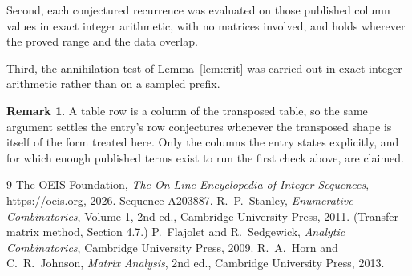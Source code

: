 \documentclass[11pt,a4paper]{article}
\theoremstyle{plain}
\theoremstyle{definition}
\newtheorem{remark}[theorem]{Remark}
\begin{document}
Second, each conjectured recurrence was evaluated on those published column values in exact
integer arithmetic, with no matrices involved, and holds wherever the proved range and the
data overlap.

Third, the annihilation test of Lemma~\ref{lem:crit} was carried out in exact integer
arithmetic rather than on a sampled prefix.

\begin{remark}
A table row is a column of the transposed table, so the same argument settles the entry's row
conjectures whenever the transposed shape is itself of the form treated here. Only the columns
the entry states explicitly, and for which enough published terms exist to run the first check
above, are claimed.
\end{remark}

\begin{thebibliography}{9}
 The OEIS Foundation, \emph{The On-Line Encyclopedia of Integer
Sequences}, \url{https://oeis.org}, 2026. Sequence A203887.
 R.~P.~Stanley, \emph{Enumerative Combinatorics}, Volume 1, 2nd ed.,
Cambridge University Press, 2011. (Transfer-matrix method, Section 4.7.)
 P.~Flajolet and R.~Sedgewick, \emph{Analytic Combinatorics}, Cambridge
University Press, 2009.
 R.~A.~Horn and C.~R.~Johnson, \emph{Matrix Analysis}, 2nd ed., Cambridge
University Press, 2013.
\end{thebibliography}
\end{document}
